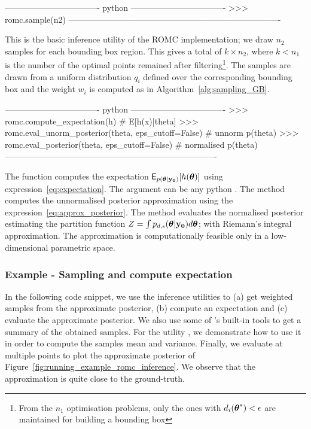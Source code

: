 \begin{Code}
---------------------------------- python ----------------------------------
>>> romc.sample(n2)
----------------------------------------------------------------------------
\end{Code}

\noindent
This is the basic inference utility of the ROMC implementation; we
draw \(n_2\) samples for each bounding box region. This gives a total of
\(k \times n_2\), where \(k < n_1\) is the number of the optimal points
remained after filtering\footnote{From the \(n_1\) optimisation
  problems, only the ones with \(d_i(\boldsymbol{\theta}^*) < \epsilon\) are
  maintained for building a bounding box}. The samples are drawn from
a uniform distribution \(q_i\) defined over the corresponding bounding
box and the weight \(w_i\) is computed as in
Algorithm~\ref{alg:sampling_GB}.

\begin{Code}
---------------------------------- python ----------------------------------
>>> romc.compute_expectation(h) # E[h(x)|theta]
>>> romc.eval_unorm_posterior(theta, eps_cutoff=False) # unnorm p(theta)
>>> romc.eval_posterior(theta, eps_cutoff=False) # normalised p(theta)
----------------------------------------------------------------------------
\end{Code}

\noindent
The function  computes the expectation
\(\mathsf{E}_{p(\boldsymbol{\theta}|\mathbf{y_0})}[h(\boldsymbol{\theta})]\) using
expression~\eqref{eq:expectation}. The argument  can be any
python . The method  computes
the unnormalised posterior approximation using the
expression~\eqref{eq:approx_posterior}. The method 
evaluates the normalised posterior estimating the partition function
\(Z = \int p_{d,\epsilon}(\boldsymbol{\theta}|\mathbf{y_0})d\boldsymbol{\theta}\); with Riemann's
integral approximation. The approximation is computationally feasible
only in a low-dimensional parametric space.

\subsubsection*{Example - Sampling and compute expectation}

In the following code snippet, we use the inference utilities to (a)
get weighted samples from the approximate posterior, (b) compute an
expectation and (c) evaluate the approximate posterior. We also use
some of 's built-in tools to get a summary of the obtained
samples. For the utility , we demonstrate
how to use it in order to compute the samples mean and
variance. Finally, we evaluate  at multiple
points to plot the approximate posterior of
Figure~\ref{fig:running_example_romc_inference}. We observe that the
approximation is quite close to the ground-truth.

